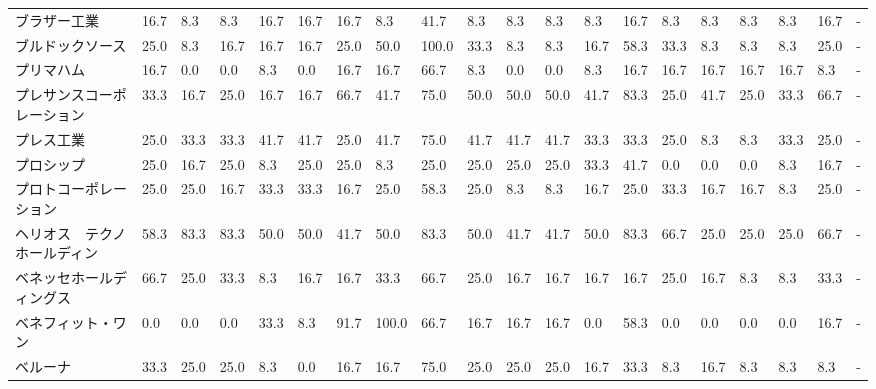 \begin{tabular}{llllllllllllllllllll}
ブラザー工業          &   16.7 &    8.3 &       8.3 &      16.7 &       16.7 &   16.7 &    8.3 &   41.7 &     8.3 &     8.3 &    8.3 &   8.3 &   16.7 &     8.3 &     8.3 &   8.3 &   8.3 &  16.7 &     - \\
ブルドックソース        &   25.0 &    8.3 &      16.7 &      16.7 &       16.7 &   25.0 &   50.0 &  100.0 &    33.3 &     8.3 &    8.3 &  16.7 &   58.3 &    33.3 &     8.3 &   8.3 &   8.3 &  25.0 &     - \\
プリマハム           &   16.7 &    0.0 &       0.0 &       8.3 &        0.0 &   16.7 &   16.7 &   66.7 &     8.3 &     0.0 &    0.0 &   8.3 &   16.7 &    16.7 &    16.7 &  16.7 &  16.7 &   8.3 &     - \\
プレサンスコーポレーション   &   33.3 &   16.7 &      25.0 &      16.7 &       16.7 &   66.7 &   41.7 &   75.0 &    50.0 &    50.0 &   50.0 &  41.7 &   83.3 &    25.0 &    41.7 &  25.0 &  33.3 &  66.7 &     - \\
プレス工業           &   25.0 &   33.3 &      33.3 &      41.7 &       41.7 &   25.0 &   41.7 &   75.0 &    41.7 &    41.7 &   41.7 &  33.3 &   33.3 &    25.0 &     8.3 &   8.3 &  33.3 &  25.0 &     - \\
プロシップ           &   25.0 &   16.7 &      25.0 &       8.3 &       25.0 &   25.0 &    8.3 &   25.0 &    25.0 &    25.0 &   25.0 &  33.3 &   41.7 &     0.0 &     0.0 &   0.0 &   8.3 &  16.7 &     - \\
プロトコーポレーション     &   25.0 &   25.0 &      16.7 &      33.3 &       33.3 &   16.7 &   25.0 &   58.3 &    25.0 &     8.3 &    8.3 &  16.7 &   25.0 &    33.3 &    16.7 &  16.7 &   8.3 &  25.0 &     - \\
ヘリオス　テクノ　ホールディン &   58.3 &   83.3 &      83.3 &      50.0 &       50.0 &   41.7 &   50.0 &   83.3 &    50.0 &    41.7 &   41.7 &  50.0 &   83.3 &    66.7 &    25.0 &  25.0 &  25.0 &  66.7 &     - \\
ベネッセホールディングス    &   66.7 &   25.0 &      33.3 &       8.3 &       16.7 &   16.7 &   33.3 &   66.7 &    25.0 &    16.7 &   16.7 &  16.7 &   16.7 &    25.0 &    16.7 &   8.3 &   8.3 &  33.3 &     - \\
ベネフィット・ワン       &    0.0 &    0.0 &       0.0 &      33.3 &        8.3 &   91.7 &  100.0 &   66.7 &    16.7 &    16.7 &   16.7 &   0.0 &   58.3 &     0.0 &     0.0 &   0.0 &   0.0 &  16.7 &     - \\
ベルーナ            &   33.3 &   25.0 &      25.0 &       8.3 &        0.0 &   16.7 &   16.7 &   75.0 &    25.0 &    25.0 &   25.0 &  16.7 &   33.3 &     8.3 &    16.7 &   8.3 &   8.3 &   8.3 &     - \\

\end{tabular}
